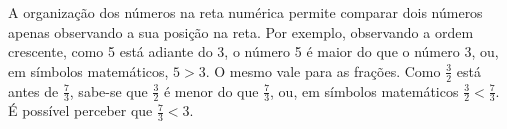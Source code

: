 \begin{center}
\end{center}
\begin{minipage}[l]{.45\linewidth}

 \setlength{\parindent}{18pt} A organização dos números na reta numérica permite comparar dois números apenas observando a sua posição na reta. Por exemplo, observando a ordem crescente, como 5 está adiante do 3, o número 5 é maior do que o número 3, ou, em símbolos matemáticos, $5 > 3$. O mesmo vale para as frações. Como $\frac{3}{2}$ está antes de $\frac{7}{3}$, sabe-se que $\frac{3}{2}$ é menor do que $\frac{7}{3}$, ou, em símbolos matemáticos $\frac{3}{2} < \frac{7}{3}$. É possível perceber que $\frac{7}{3} < 3$. 

\begin{center}
\end{center}

\end{minipage}\hfill
